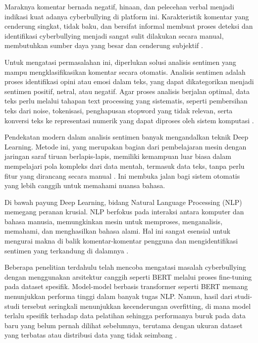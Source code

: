 Maraknya komentar bernada negatif, hinaan, dan pelecehan verbal menjadi indikasi kuat adanya cyberbullying di platform ini. Karakteristik komentar yang cenderung singkat, tidak baku, dan bersifat informal membuat proses deteksi dan identifikasi cyberbullying menjadi sangat sulit dilakukan secara manual, membutuhkan sumber daya yang besar dan cenderung subjektif \cite{aser2022fenomena}.

Untuk mengatasi permasalahan ini, diperlukan solusi analisis sentimen yang mampu mengklasifikasikan komentar secara otomatis. Analisis sentimen adalah proses identifikasi opini atau emosi dalam teks, yang dapat dikategorikan menjadi sentimen positif, netral, atau negatif. Agar proses analisis berjalan optimal, data teks perlu melalui tahapan text processing yang sistematis, seperti pembersihan teks dari noise, tokenisasi, penghapusan stopword yang tidak relevan, serta konversi teks ke representasi numerik yang dapat diproses oleh sistem komputasi \cite{razi2017klasifikasi}.

Pendekatan modern dalam analisis sentimen banyak mengandalkan teknik Deep Learning. Metode ini, yang merupakan bagian dari pembelajaran mesin dengan jaringan saraf tiruan berlapis-lapis, memiliki kemampuan luar biasa dalam mempelajari pola kompleks dari data mentah, termasuk data teks, tanpa perlu fitur yang dirancang secara manual \cite{liao2017cnn}. Ini membuka jalan bagi sistem otomatis yang lebih canggih untuk memahami nuansa bahasa.

Di bawah payung Deep Learning, bidang Natural Language Processing (NLP) memegang peranan krusial. NLP berfokus pada interaksi antara komputer dan bahasa manusia, memungkinkan mesin untuk memproses, menganalisis, memahami, dan menghasilkan bahasa alami. Hal ini sangat esensial untuk mengurai makna di balik komentar-komentar pengguna dan mengidentifikasi sentimen yang terkandung di dalamnya \cite{razi2017klasifikasi}.

Beberapa penelitian terdahulu telah mencoba mengatasi masalah cyberbullying dengan menggunakan arsitektur canggih seperti BERT melalui proses fine-tuning pada dataset spesifik. Model-model berbasis transformer seperti BERT memang menunjukkan performa tinggi dalam banyak tugas NLP. Namun, hasil dari studi-studi tersebut seringkali menunjukkan kecenderungan overfitting, di mana model terlalu spesifik terhadap data pelatihan sehingga performanya buruk pada data baru yang belum pernah dilihat sebelumnya, terutama dengan ukuran dataset yang terbatas atau distribusi data yang tidak seimbang \cite{10468424}.

